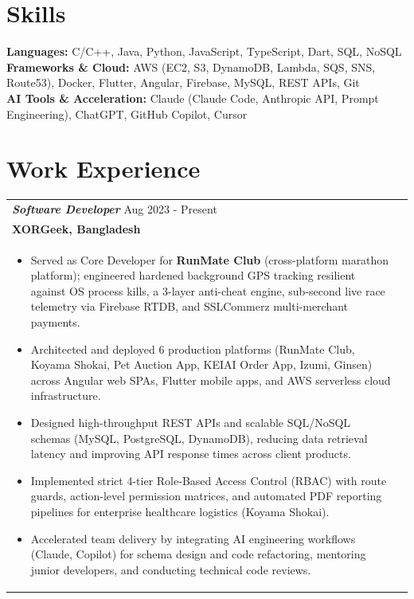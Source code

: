 \documentclass[a4paper,8pt]{article}
\begin{document}
\vspace{8pt}
\section{Skills}
\textbf{Languages:} C/C++, Java, Python, JavaScript, TypeScript, Dart, SQL, NoSQL\\[3.5pt]
\textbf{Frameworks \& Cloud:} AWS (EC2, S3, DynamoDB, Lambda, SQS, SNS, Route53), Docker, Flutter, Angular, Firebase, MySQL, REST APIs, Git\\[3.5pt]
\textbf{AI Tools \& Acceleration:} Claude (Claude Code, Anthropic API, Prompt Engineering), ChatGPT, GitHub Copilot, Cursor

\vspace{8pt}
\section{Work Experience}

\begin{tabularx}{\linewidth}{ @{}l r@{} }
\textbf{\textit{Software Developer}} \hfill Aug 2023 - Present \\[2pt]
\textbf{{XORGeek, Bangladesh}} \hfill \\[3pt]
\begin{minipage}[t]{\linewidth}
\begin{itemize}[nosep,after=\strut, leftmargin=1.5em, itemsep=3pt]
\item Served as Core Developer for \textbf{RunMate Club} (cross-platform marathon platform); engineered hardened background GPS tracking resilient against OS process kills, a 3-layer anti-cheat engine, sub-second live race telemetry via Firebase RTDB, and SSLCommerz multi-merchant payments.
\item Architected and deployed 6 production platforms (RunMate Club, Koyama Shokai, Pet Auction App, KEIAI Order App, Izumi, Ginsen) across Angular web SPAs, Flutter mobile apps, and AWS serverless cloud infrastructure.
\item Designed high-throughput REST APIs and scalable SQL/NoSQL schemas (MySQL, PostgreSQL, DynamoDB), reducing data retrieval latency and improving API response times across client products.
\item Implemented strict 4-tier Role-Based Access Control (RBAC) with route guards, action-level permission matrices, and automated PDF reporting pipelines for enterprise healthcare logistics (Koyama Shokai).
\item Accelerated team delivery by integrating AI engineering workflows (Claude, Copilot) for schema design and code refactoring, mentoring junior developers, and conducting technical code reviews.
\end{itemize}
\end{minipage}
\end{tabularx}
\end{document}
